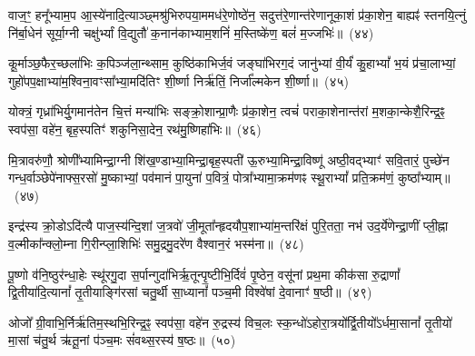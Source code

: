 {\anuvakamend[{स्ते॒गान्द्वाविꣳ॑शतिः}]}%

वाज॒ꣳ॒ हनू᳚भ्याम॒प आ॒स्ये॑नादि॒त्याञ्छ्मश्रु॑भिरुपया॒ममध॑रे॒णोष्ठे॑न॒ सदुत्त॑रे॒णान्त॑रेणानूका॒शं प्र॑का॒शेन॒ बाह्यꣴ॑ स्तनयि॒त्नुं नि॑र्बा॒धेन॑ सूर्या॒ग्नी चक्षु॑र्भ्यां वि॒द्युतौ॑ क॒नान॑काभ्याम॒शनिं॑ म॒स्तिष्के॑ण॒ बलं॑ म॒ज्जभिः॑॥~(४४)

{\anuvakamend[{वाजं॒ पञ्च॑विꣳशतिः}]}%

कू॒र्माञ्छ॒फैर॒च्छला॑भिः क॒पिञ्ज॑ला॒न्थ्साम॒ कुष्ठि॑काभिर्ज॒वं जङ्घा॑भिरग॒दं जानु॑भ्यां वी॒र्यं॑ कु॒हा\-भ्यां᳚ भ॒यं प्र॑चा॒लाभ्यां॒ गुहो॑पप॒क्षाभ्या॑म॒श्विना॒वꣳसा᳚भ्या॒मदि॑तिꣳ शी॒र्ष्णा निर्\mbox{}ऋ॑तिं॒ निर्जा᳚ल्मकेन शी॒र्ष्णा॥~(४५)

{\anuvakamend[{कू॒र्मान्त्रयो॑विꣳशतिः}]}%

योक्त्रं॒ गृध्रा॑भिर्यु॒गमान॑तेन चि॒त्तं मन्या॑भिः सङ्क्रो॒शान्प्रा॒णैः प्र॑का॒शेन॒ त्वचं॑ पराका॒शेनान्त॑रां म॒शका॒न्केशै॒रिन्द्र॒ꣴ॒ स्वप॑सा॒ वहे॑न॒ बृह॒स्पतिꣳ॑ शकुनिसा॒देन॒ रथ॑मु॒ष्णिहा॑भिः॥~(४६)

{\anuvakamend[{योक्त्र॒मेक॑विꣳशतिः}]}%

मि॒त्रावरु॑णौ॒ श्रोणी᳚भ्यामिन्द्रा॒ग्नी शि॑ख॒ण्डाभ्या॒मिन्द्रा॒बृह॒स्पती॑ ऊ॒रुभ्या॒मिन्द्रा॒विष्णू॑ अष्ठी॒वद्भ्याꣳ॑ सवि॒तारं॒ पुच्छे॑न गन्ध॒र्वाञ्छेपे॑नाफ्स॒रसो॑ मु॒ष्काभ्यां॒ पव॑मानं पा॒युना॑ प॒वित्रं॒ पोत्रा᳚भ्यामा॒क्रम॑णꣴ स्थू॒रा\-भ्यां᳚ प्रति॒क्रम॑णं॒ कुष्ठा᳚भ्याम्॥~(४७)

{\anuvakamend[{}]}%

इन्द्र॑स्य क्रो॒डो\-ऽदि॑त्यै पाज॒स्य॑न्दि॒शां ज॒त्रवो॑ जी॒मूता᳚न्हृदयौप॒शाभ्या॑म॒न्तरि॑क्षं पुरि॒तता॒ नभ॑ उद॒र्ये॑णेन्द्रा॒णीं प्ली॒ह्ना व॒ल्मीका᳚न्क्लो॒म्ना गि॒रीन्प्ला॒शिभिः॑ समु॒द्रमु॒दरे॑ण वैश्वान॒रं भस्म॑ना॥~(४८)

{\anuvakamend[{मि॒त्रावरु॑णा॒विन्द्र॑स्य॒ द्वाविꣳ॑शति॒र्द्वाविꣳ॑शतिः}]}%

पू॒ष्णो व॑नि॒ष्ठुर॑न्धा॒हेः स्थू॑रगु॒दा स॒र्पान्गुदा॑भिर्\mbox{}ऋ॒तून्पृ॒ष्टीभि॒र्दिवं॑ पृ॒ष्ठेन॒ वसू॑नां प्रथ॒मा कीक॑सा रु॒द्राणां᳚ द्वि॒तीया॑दि॒त्यानां᳚ तृ॒तीयाङ्गि॑रसां चतु॒र्थी सा॒ध्यानां᳚ पञ्च॒मी विश्वे॑षां दे॒वानाꣳ॑ ष॒ष्ठी॥~(४९)

{\anuvakamend[{पू॒ष्णश्चतु॑र्विꣳशतिः}]}%

ओजो᳚ ग्री॒वाभि॒र्निर्\mbox{}ऋ॑तिम॒स्थभि॒रिन्द्र॒ꣴ॒ स्वप॑सा॒ वहे॑न रु॒द्रस्य॑ विच॒लः स्क॒न्धो॑\-ऽहोरा॒त्रयो᳚र्द्वि॒तीयो᳚\-ऽर्धमा॒सानां᳚ तृ॒तीयो॑ मा॒सां च॑तु॒र्थ ऋ॑तू॒नां प॑ञ्च॒मः सं॑वथ्स॒रस्य॑ ष॒ष्ठः॥~(५०)

{\anuvakamend[{ओजो॑ विꣳश॒तिः}]}%

